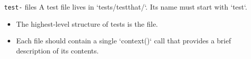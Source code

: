 \documentclass[12pt,handout]{beamer}
\begin{document}
\begin{frame}[fragile]{\texttt{test-} files}
A test file lives in `tests/testthat/`. Its name must start with `test`. 


\begin{itemize}
\item The highest-level structure of tests is the file. 
\item Each file should contain a single `context()` call that provides a brief description of its contents. 
\end{itemize}
\end{frame}

\end{document}
